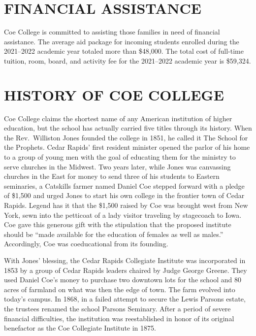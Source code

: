 \documentclass[
  letterpaper,
]{scrbook}
\begin{document}
\section{FINANCIAL ASSISTANCE}\label{financial-assistance}

Coe College is committed to assisting those families in need of
financial assistance. The average aid package for incoming students
enrolled during the 2021--2022 academic year totaled more than \$48,000.
The total cost of full-time tuition, room, board, and activity fee for
the 2021--2022 academic year is \$59,324.

\section{HISTORY OF COE COLLEGE}\label{sec-history-of-coe-college}

Coe College claims the shortest name of any American institution of
higher education, but the school has actually carried five titles
through its history. When the Rev.~Williston Jones founded the college
in 1851, he called it The School for the Prophets. Cedar Rapids' first
resident minister opened the parlor of his home to a group of young men
with the goal of educating them for the ministry to serve churches in
the Midwest. Two years later, while Jones was canvassing churches in the
East for money to send three of his students to Eastern seminaries, a
Catskills farmer named Daniel Coe stepped forward with a pledge of
\$1,500 and urged Jones to start his own college in the frontier town of
Cedar Rapids. Legend has it that the \$1,500 raised by Coe was brought
west from New York, sewn into the petticoat of a lady visitor traveling
by stagecoach to Iowa. Coe gave this generous gift with the stipulation
that the proposed institute should be ``made available for the education
of females as well as males.'' Accordingly, Coe was coeducational from
its founding.

With Jones' blessing, the Cedar Rapids Collegiate Institute was
incorporated in 1853 by a group of Cedar Rapids leaders chaired by Judge
George Greene. They used Daniel Coe's money to purchase two downtown
lots for the school and 80 acres of farmland on what was then the edge
of town. The farm evolved into today's campus. In 1868, in a failed
attempt to secure the Lewis Parsons estate, the trustees renamed the
school Parsons Seminary. After a period of severe financial
difficulties, the institution was reestablished in honor of its original
benefactor as the Coe Collegiate Institute in 1875.
\end{document}
